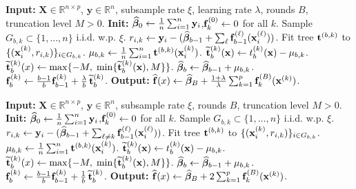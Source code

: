	\begin{algorithm}[ht!]
		\caption{}
		\label{alg:brebm_ident}
		\begin{algorithmic}[1]
			\State \textbf{Input:} $\mathbf{X}\in\mathbb{R}^{n\times p}$, $\mathbf{y}\in\mathbb{R}^n$, subsample rate $\xi$, learning rate $\lambda$, rounds $B$, truncation level $M>0$.
			\State \textbf{Init:} $\widehat{\bm{\beta}}_0 \gets \frac{1}{n}\sum_{i=1}^n \mathbf{y}_i$,\quad $\mathbf{f}_k^{(0)} \gets 0$ for all $k$.
			\State Sample $G_{b,k}\subset\{1,\dots,n\}$ i.i.d. w.p. $\xi$.
			\State $r_{i,k} \gets \mathbf{y}_i - (\widehat{\bm{\beta}}_{b-1} + \sum_{\ell} \mathbf{f}_{b-1}^{(\ell)}(\mathbf{x}_i^{(\ell)}))$.
			\State Fit tree $\mathbf{t}^{(b,k)}$ to $\{(\mathbf{x}_i^{(k)}, r_{i,k})\}_{i\in G_{b,k}}$.
			\State $\mu_{b,k} \gets \frac{1}{n}\sum_{i=1}^n \mathbf{t}^{(b,k)}(\mathbf{x}_i^{(k)})$.
			\State $\widetilde {\mathbf{t}}_b^{(k)}(\mathbf{x}) \gets t_b^{(k)}(\mathbf{x}) - \mu_{b,k}$.
			\State $\widetilde {\mathbf{t}}_b^{(k)}(x) \gets \max\{-M,\;\min\{\widetilde {\mathbf{t}}_b^{(k)}(\mathbf{x}),M\}\}$.
			\State $\widehat{\bm{\beta}}_b \gets \widehat{\bm{\beta}}_{b-1} + \mu_{b,k}$.
			\State $\mathbf{f}_b^{(k)} \gets \frac{b-1}{b} \mathbf{f}_{b-1}^{(k)} + \frac{\lambda}{b}\,\widetilde {\mathbf{t}}_b^{(k)}$.
			\EndFor
			\EndFor
			\State \textbf{Output:} $\widehat {\mathbf{f}}(x) \gets \widehat{\bm{\beta}}_B + \frac{1+\lambda}{\lambda}\sum_{k=1}^p \mathbf{f}_k^{(B)}(\mathbf{x}^{(k)})$.
		\end{algorithmic}
	\end{algorithm}

	\begin{algorithm}[ht!]
		\caption{}
		\label{alg:ebm_bratp}
		\begin{algorithmic}[1]
			\State \textbf{Input:} $\mathbf{X}\in\mathbb{R}^{n\times p}$, $\mathbf{y}\in\mathbb{R}^n$, subsample rate $\xi$, rounds $B$, truncation level $M>0$.
			\State \textbf{Init:} $\widehat{\bm{\beta}}_0 \gets \frac{1}{n}\sum_{i=1}^n \mathbf{y}_i$,\quad $\mathbf{f}_k^{(0)} \gets 0$ for all $k$.
			\State Sample $G_{b,k}\subset\{1,\dots,n\}$ i.i.d. w.p. $\xi$.
			\State $r_{i,k} \gets \mathbf{y}_i - (\widehat{\bm{\beta}}_{b-1} + \sum_{\ell \neq k} \mathbf{f}_{b-1}^{(\ell)}(\mathbf{x}_i^{(\ell)}))$.
			\State Fit tree $\mathbf{t}^{(b,k)}$ to $\{(\mathbf{x}_i^{(k)}, r_{i,k})\}_{i\in G_{b,k}}$.
			\State $\mu_{b,k} \gets \frac{1}{n}\sum_{i=1}^n \mathbf{t}^{(b,k)}(\mathbf{x}_i^{(k)})$.
			\State $\widetilde {\mathbf{t}}_b^{(k)}(\mathbf{x}) \gets t_b^{(k)}(\mathbf{x}) - \mu_{b,k}$.
			\State $\widetilde {\mathbf{t}}_b^{(k)}(x) \gets \max\{-M,\;\min\{\widetilde {\mathbf{t}}_b^{(k)}(\mathbf{x}),M\}\}$.
			\State $\widehat{\bm{\beta}}_b \gets \widehat{\bm{\beta}}_{b-1} + \mu_{b,k}$.
			\State $\mathbf{f}_b^{(k)} \gets \frac{b-1}{b} \mathbf{f}_{b-1}^{(k)} + \frac{1}{b}\,\widetilde {\mathbf{t}}_b^{(k)}$.
			\EndFor
			\EndFor
			\State \textbf{Output:} $\widehat {\mathbf{f}}(x) \gets \widehat{\bm{\beta}}_B + 2\sum_{k=1}^p \mathbf{f}_k^{(B)}(\mathbf{x}^{(k)})$.
		\end{algorithmic}
	\end{algorithm}
	

